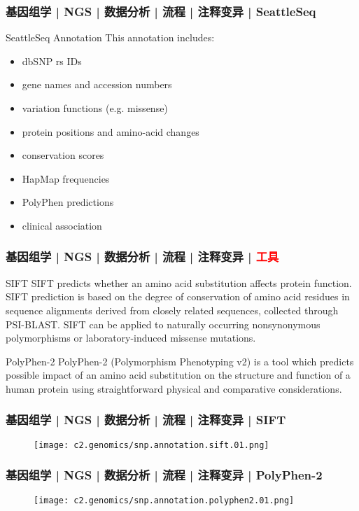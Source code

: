 \begin{frame}
  \frametitle{基因组学 | NGS | 数据分析 | 流程 | 注释变异 | SeattleSeq}
  \begin{block}{SeattleSeq Annotation}
  This annotation includes:
  \begin{itemize}
    \item dbSNP rs IDs
    \item gene names and accession numbers
    \item variation functions (e.g. missense)
    \item protein positions and amino-acid changes
    \item conservation scores
    \item HapMap frequencies
    \item PolyPhen predictions
    \item clinical association
  \end{itemize}
  \end{block}
\end{frame}

\begin{frame}
  \frametitle{基因组学 | NGS | 数据分析 | 流程 | 注释变异 | \textcolor{red}{工具}}
  \begin{block}{SIFT}
    SIFT predicts whether an amino acid substitution affects protein function. SIFT prediction is based on the degree of conservation of amino acid residues in sequence alignments derived from closely related sequences, collected through PSI-BLAST. SIFT can be applied to naturally occurring nonsynonymous polymorphisms or laboratory-induced missense mutations.
  \end{block}
  \pause
  \begin{block}{PolyPhen-2}
    PolyPhen-2 (Polymorphism Phenotyping v2) is a tool which predicts possible impact of an amino acid substitution on the structure and function of a human protein using straightforward physical and comparative considerations.
  \end{block}
\end{frame}

\begin{frame}
  \frametitle{基因组学 | NGS | 数据分析 | 流程 | 注释变异 | SIFT}
  \begin{figure}
    \centering
    \texttt{[image: c2.genomics/snp.annotation.sift.01.png]}
  \end{figure}
\end{frame}

\begin{frame}
  \frametitle{基因组学 | NGS | 数据分析 | 流程 | 注释变异 | PolyPhen-2}
  \begin{figure}
    \centering
    \texttt{[image: c2.genomics/snp.annotation.polyphen2.01.png]}
  \end{figure}
\end{frame}

